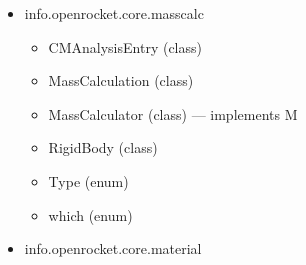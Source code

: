 \documentclass{amsdtx}
\begin{document}
\begin{itemize}
\begin{itemize}
\begin{itemize}
    \item
      Cause (enum)
    \item
      Error (class) --- extends M
    \item
      ErrorSet (class) --- extends M
    \item
      EventAfterLanding (class) --- extends W
    \item
      HighSpeedDeployment (class) --- extends W
    \item
      LargeAOA (class) --- extends W
    \item
      Markers (class)
    \item
      Message (class) --- implements C
    \item
      MessagePriority (enum)
    \item
      MessageSet (class)
    \item
      MissingMotor (class) --- extends W
    \item
      Other (class) --- extends W
    \item
      Other (class) --- extends E
    \item
      SimulationAbort (class) --- extends M
    \item
      Warning (class) --- extends M
    \item
      WarningSet (class) --- extends M
    \item
      doesn (class)
    \end{itemize}
  \item
    info.openrocket.core.masscalc

    \begin{itemize}
    
    \item
      CMAnalysisEntry (class)
    \item
      MassCalculation (class)
    \item
      MassCalculator (class) --- implements M
    \item
      RigidBody (class)
    \item
      Type (enum)
    \item
      which (enum)
    \end{itemize}
  \item
    info.openrocket.core.material

    \begin{itemize}
    

\end{itemize}
\end{itemize}
\end{itemize}
\end{document}
